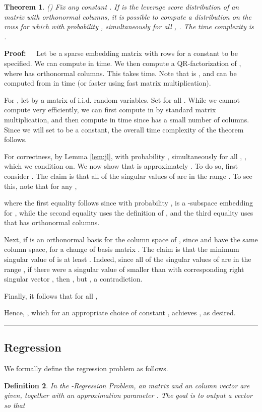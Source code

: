 \documentclass[11pt]{article}
\newtheorem{theorem}{Theorem}
\newtheorem{definition}[theorem]{Definition}
\newenvironment{proof}{\begin{trivlist} \item {\bf Proof:~~}}
  {\qed\end{trivlist}}
\def\qed{\hfill\rule{2mm}{2mm}}
\begin{document}
\begin{theorem}\label{thm:fastLS}(\cite{CW13})
Fix any constant . 
If  is the leverage score distribution of an  matrix  with orthonormal columns, it is possible to compute
a distribution  on the  rows for which with probability , simultaneously 
for all , . The time complexity is . 
\end{theorem}
\begin{proof}
Let  be a sparse embedding matrix with  rows for a constant  to be specified.  
We can compute  in  time. We then compute a QR-factorization of , where
 has orthonormal columns. This takes  time. Note that  is , and can be computed
from  in  time (or faster using fast matrix multiplication). 

For , 
let  by a  matrix of i.i.d.  random variables. Set  for all .
While we cannot compute  very efficiently, we can first compute  in 
by standard matrix multiplication, and then compute  in  time since
 has a small number of columns. 
Since we will set  to be a constant, the overall time complexity of the theorem follows. 

For correctness, by Lemma \ref{lem:jl}, 
with probability , simultaneously for all , , which we condition on.
We now show that  is approximately . To do so, first consider . The claim is that
all of the singular values of  are in the range . To see this, note that for any ,

where the first equality follows since with probability ,  is a  -subspace embedding for ,
while the second equality uses the definition of , and the third equality uses that  has orthonormal columns. 

Next, if  is an orthonormal basis for the column space of , since  and  have the same column
space,  for a  change of basis matrix . The claim is that the minimum singular
value of  is at least . Indeed, since all of the singular values of  are in 
the range , if there were a singular value of  smaller than  with corresponding right singular
vector , then , but , a contradiction. 

Finally, it follows that for all , 

Hence, , which for an appropriate choice of constant , achieves
, as desired. 
\end{proof}


\subsection{Regression}\label{sec:regression}
We formally define the regression problem as follows. 
\begin{definition}\label{prob:regression}
In the {\it -Regression Problem}, an  matrix  and an 
 column vector  are given, together with an approximation parameter .  
The goal is to output a vector  so that

\end{definition}
\end{document}
